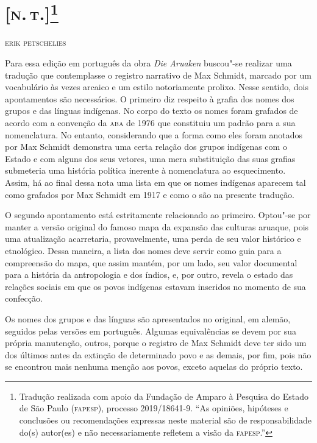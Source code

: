 \chapter[{[}\textsc{n.\,t.}{]}, \emph{por Erik Petschelies}]{{[}\textsc{n.\,t.}{]}\footnote{Tradução realizada com apoio da Fundação de Amparo à Pesquisa do Estado de São Paulo (\textsc{fapesp}), processo 2019/18641-9.
``As opiniões, hipóteses e conclusões ou recomendações expressas neste material são de responsabilidade do(s) autor(es) e não necessariamente refletem a visão da \textsc{fapesp}.''}}
\hedramarkboth{{[}\textsc{n.\,t.}{]}}{}

\begin{flushright}
\textsc{erik petschelies}\medskip
\end{flushright}

\noindent{}Para essa edição em português da obra \emph{Die Aruaken} buscou"-se
realizar uma tradução que contemplasse o registro narrativo de Max
Schmidt, marcado por um vocabulário às vezes arcaico e um estilo
notoriamente prolixo. Nesse sentido, dois apontamentos são necessários.
O primeiro diz respeito à grafia dos nomes dos grupos e das línguas
indígenas. No corpo do texto os nomes foram grafados de acordo com a
convenção da \textsc{aba} de 1976 que constituiu um padrão para a sua
nomenclatura. No entanto, considerando que a forma como eles foram
anotados por Max Schmidt demonstra uma certa relação dos grupos
indígenas com o Estado e com alguns dos seus vetores, uma mera
substituição das suas grafias submeteria uma história política inerente
à nomenclatura ao esquecimento. Assim, há ao final dessa nota uma lista
em que os nomes indígenas aparecem tal como grafados por Max Schmidt em
1917 e como o são na presente tradução.

O segundo apontamento está estritamente relacionado ao primeiro.
Optou"-se por manter a versão original do famoso mapa da expansão das
culturas aruaque, pois uma atualização acarretaria, provavelmente, uma
perda de seu valor histórico e etnológico. Dessa maneira, a lista dos
nomes deve servir como guia para a compreensão do mapa, que assim
mantém, por um lado, seu valor documental para a história da
antropologia e dos índios, e, por outro, revela o estado das relações
sociais em que os povos indígenas estavam inseridos no momento de sua
confecção.

Os nomes dos grupos e das línguas são apresentados no original, em
alemão, seguidos pelas versões em português. Algumas equivalências se
devem por sua própria manutenção, outros, porque o registro de Max
Schmidt deve ter sido um dos últimos antes da extinção de determinado
povo e as demais, por fim, pois não se encontrou mais nenhuma menção aos
povos, exceto aquelas do próprio texto.

